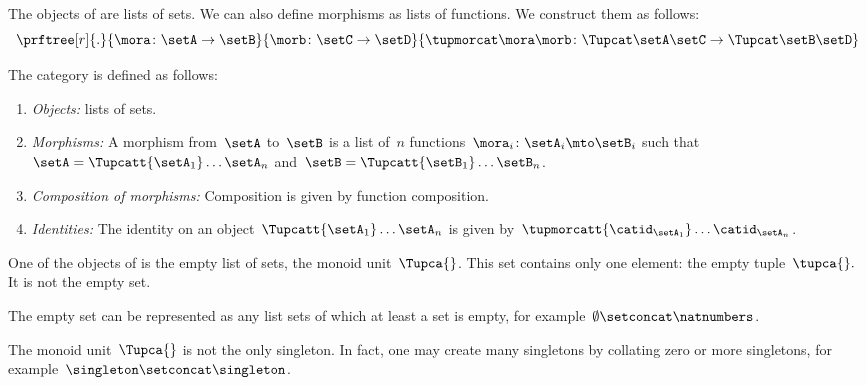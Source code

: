 The objects of \SetStar are lists of sets.
We can also define morphisms as lists of functions.
We construct them as follows:
%
\begin{equation}
    \label{eq:sets-monoid-maps2}
    \prftree[r]{.}{
        \mora \colon \setA \to \setB
    }{
        \morb \colon \setC \to \setD
    }{
        \tupmorcat \mora \morb \colon \Tupcat \setA   \setC \to \Tupcat \setB  \setD
    }
\end{equation}
%
\begin{definition}
    \label{def:SetL}
    The category \SetStar is defined as follows:
    \begin{enumerate}
        \item \emph{Objects:} lists of sets.
        \item \emph{Morphisms:} A morphism from~$\setA$ to~$\setB$ is a list of~$n$ functions~$\mora_i\colon \setA_i \mto \setB_i$ such that~$\setA = \Tupcatt {\setA_1}  \dots {\setA_n}$ and~$\setB = \Tupcatt {\setB_1} \dots {\setB_n}$.
        \item \emph{Composition of morphisms:} Composition is given by function composition.
        \item \emph{Identities:} The identity on an object~$\Tupcatt {\setA_1} \dots {\setA_n}$ is given by~$\tupmorcatt {\catid_{\setA_1}} \dots  {\catid_{\setA_n}} $.
    \end{enumerate}
\end{definition}


One of the objects of \SetStar is the empty list of sets, the monoid unit~$\Tupca{ }$.
This set contains only one element: the empty tuple~$\tupca{ }.$
It is not the empty set.

The empty set can be represented as any list sets of which at least a set is empty, for example~$\emptyset \setconcat \natnumbers$.

The monoid unit~$\Tupca{ }$ is not the only singleton.
In fact, one may create many singletons by collating zero or more singletons, for example~$\singleton \setconcat \singleton$.

%

\showslides{
    \begin{forslides}

        \begin{equation}
            \tupca \ela   = \ela
        \end{equation}
        ~
        \begin{equation}
            \label{eq:sets-monoid-el-cat}
            \tupcat \ela \elb \elconcat \elc = \tupcatt \ela \elb \elc
        \end{equation}
    \end{forslides}
}
